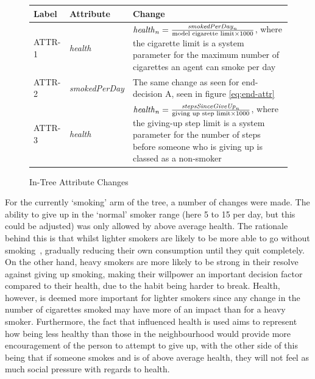 \documentclass[]{report}
\begin{document}
\begin{figure}
\begin{center}
\begin{tabular}{|l||l|p{10cm}|}
\hline
\bf{Label} & \bf{Attribute} & \bf{Change}\\
\hline
ATTR-1 	& \emph{health} 				&	$\text{\emph{health}}_{n} = \frac{\text{\emph{smokedPerDay}}_{n}}{\text{model cigarette limit} \times 1000}$, where the cigarette limit is a system parameter for the maximum number of cigarettes an agent can smoke per day		\\
ATTR-2	&	\emph{smokedPerDay}  	&	The same change as seen for end-decision A, seen in figure \ref{eq:end-attr}				\\
ATTR-3	&	\emph{health}					&	$\text{\emph{health}}_{n} = \frac{\text{\emph{stepsSinceGiveUp}}_{n}}{\text{giving up step limit} \times 1000}$, where the giving-up step limit is a system parameter for the number of steps before someone who is giving up is classed as a non-smoker \\
\hline

\end{tabular}
\end{center}
\caption{In-Tree Attribute Changes}
\label{tab:attr-change}
\end{figure}
For the currently `smoking' arm of the tree, a number of changes were made. The ability to give up in the `normal' smoker range (here 5 to 15 per day, but this could be adjusted) was only allowed by above average health. The rationale behind this is that whilst lighter smokers are likely to be more able to go without smoking~\cite{NHS-43}, gradually reducing their own consumption until they quit completely. On the other hand, heavy smokers are more likely to be strong in their resolve against giving up smoking, making their willpower an important decision factor compared to their health, due to the habit being harder to break. Health, however, is deemed more important for lighter smokers since any change in the number of cigarettes smoked may have more of an impact than for a heavy smoker. Furthermore, the fact that influenced health is used aims to represent how being less healthy than those in the neighbourhood would provide more encouragement of the person to attempt to give up, with the other side of this being that if someone smokes and is of above average health, they will not feel as much social pressure with regards to health.
\end{document}
